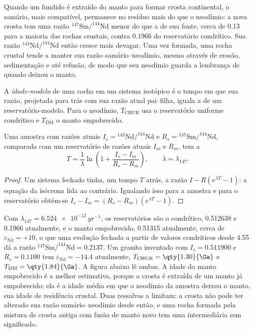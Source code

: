Quando um fundido é extraído do manto para formar crosta continental, o samário,
mais compatível, permanece no resíduo mais do que o neodímio: a nova crosta tem uma
razão $^{147}\mathrm{Sm}/^{144}\mathrm{Nd}$ menor do que a de sua fonte, cerca de 0.13
para a maioria das rochas crustais, contra 0.1966 do reservatório condrítico. Sua
razão $^{143}\mathrm{Nd}/^{144}\mathrm{Nd}$ então cresce mais devagar. Uma vez formada,
uma rocha crustal tende a manter sua razão samário--neodímio, mesmo através de erosão,
sedimentação e até refusão, de modo que seu neodímio guarda a lembrança de quando
deixou o manto.

\begin{definition}\label{def:b3:advanced-geochronology:model-age}
A \emph{idade-modelo} de uma rocha em um sistema isotópico é o
tempo em que sua razão, projetada para trás com sua razão atual pai--filha,
iguala a de um reservatório-modelo. Para o neodímio, $T_{\mathrm{CHUR}}$
usa o reservatório uniforme condrítico e $T_{\mathrm{DM}}$ o manto
empobrecido.
\end{definition}

\begin{theorem}\label{thm:b3:advanced-geochronology:model-age}
Uma amostra com razões atuais $I_s = {}^{143}\mathrm{Nd}/^{144}\mathrm{Nd}$ e
$R_s = {}^{147}\mathrm{Sm}/^{144}\mathrm{Nd}$, comparada com um reservatório de
razões atuais $I_m$ e $R_m$, tem a 
\[
T = \frac1\lambda\ln\left(1 + \frac{I_s - I_m}{R_s - R_m}\right),
\qquad \lambda = \lambda_{147}.
\]
\end{theorem}

\begin{proof}
Um sistema fechado tinha, um tempo $T$ atrás, a razão $I - R(e^{\lambda T} - 1)$:
a equação da isócrona lida ao contrário. Igualando isso para a amostra e para o
reservatório obtém-se $I_s - I_m = (R_s - R_m)(e^{\lambda T} - 1)$.
\end{proof}

Com $\lambda_{147} = \qty{6.524e-12}{yr^{-1}}$, os reservatórios são o condrítico,
0.512638 e 0.1966 atualmente, e o manto empobrecido,
0.51315 atualmente, cerca de $\varepsilon_{\mathrm{Nd}} = +10$, o que uma evolução fechada
a partir de valores condríticos desde \qty{4.55}{\Ga} dá a razão
$^{147}\mathrm{Sm}/^{144}\mathrm{Nd} = 0.2137$. Um granito inventado com
$I_s = 0.511900$ e $R_s = 0.1100$ tem $\varepsilon_{\mathrm{Nd}} = -14.4$
atualmente, $T_{\mathrm{CHUR}} = \qty{1.30}{\Ga}$ e $T_{\mathrm{DM}} =
\qty{1.84}{\Ga}$. A figura abaixo lê ambas. A idade do manto empobrecido é a
melhor estimativa, porque a crosta é extraída de um manto já empobrecido; ela é a
idade média em que o neodímio da amostra deixou o manto, sua idade de residência
crustal. Duas ressalvas a limitam: a crosta não pode ter alterado sua razão
samário--neodímio desde então, e uma rocha formada pela mistura de crosta antiga
com fusão de manto novo tem uma  intermediária sem significado.

